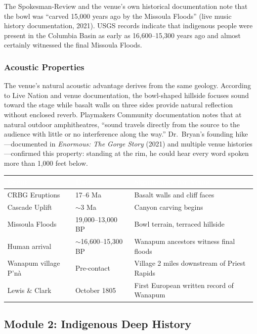 \documentclass[11pt,letterpaper]{article}
\newcommand{\tableheader}[1]{\textbf{\sffamily\textcolor{white}{#1}}}
\begin{document}
The Spokesman-Review and the venue's own historical documentation note that the bowl was ``carved 15,000 years ago by the Missoula Floods'' (live music history documentation, 2021). USGS records indicate that indigenous people were present in the Columbia Basin as early as 16,600--15,300 years ago and almost certainly witnessed the final Missoula Floods.

\subsubsection{Acoustic Properties}

The venue's natural acoustic advantage derives from the same geology. According to Live Nation and venue documentation, the bowl-shaped hillside focuses sound toward the stage while basalt walls on three sides provide natural reflection without enclosed reverb. Playmakers Community documentation notes that at natural outdoor amphitheatres, ``sound travels directly from the source to the audience with little or no interference along the way.'' Dr.\ Bryan's founding hike---documented in \textit{Enormous: The Gorge Story} (2021) and multiple venue histories---confirmed this property: standing at the rim, he could hear every word spoken more than 1,000 feet below.

\begin{center}
\begin{tabularx}{\textwidth}{L{3cm}L{3cm}X}
\toprule
{}
\tableheader{Event} & \tableheader{Date} & \tableheader{Significance for Venue} \\
\midrule
CRBG Eruptions & 17--6 Ma & Basalt walls and cliff faces \\
Cascade Uplift & $\sim$3 Ma & Canyon carving begins \\
Missoula Floods & 19,000--13,000 BP & Bowl terrain, terraced hillside \\
Human arrival & $\sim$16,600--15,300 BP & Wanapum ancestors witness final floods \\
Wanapum village P'n\`a & Pre-contact & Village 2 miles downstream of Priest Rapids \\
Lewis \& Clark & October 1805 & First European written record of Wanapum \\
\bottomrule
\end{tabularx}
\end{center}

\subsection{Module 2: Indigenous Deep History}
\end{document}
